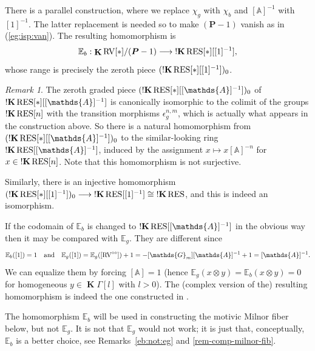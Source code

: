 \documentclass[12pt]{amsart}
\theoremstyle{plain}
\theoremstyle{definition}
\theoremstyle{remark}
\newtheorem{rem}[thm]{Remark}
\numberwithin{equation}{section}
\theoremstyle{plain}
\newcommand{\RV}{\textup{RV}}
\newcommand{\A}{\mathds{A}}
\newcommand{\G}{\mathds{G}}
\newcommand{\dand}{\quad \text{and} \quad}
\newcommand{\0}{\emptyset}
\newcommand{\bb}[1]{\mathbb{#1}}
\newcommand{\fun}{\longrightarrow}
\newcommand{\efun}{\longmapsto}
\newcommand{\RES}{\textup{RES}}
\DeclareMathOperator{\ggk}{\mathbf{K}}
\DeclareMathOperator{\sggk}{!\mathbf{K}}
\begin{document}
There is a parallel construction, where  we replace $\chi_g$ with $\chi_b$ and $[\A]^{-1}$ with $[1]^{-1}$. The latter replacement is needed so to make $(\bm P - 1)$ vanish as in (\ref{eg:isp:van}). The resulting homomorphism is
\begin{equation}\label{EB}
\bb E_b : \ggk \RV[*] / (\bm P - 1) \fun \sggk \RES[*][[1]^{-1}],
\end{equation}
whose range is precisely the zeroth piece  $(\sggk \RES[*][[1]^{-1}])_0$.

\begin{rem}\label{eb:no:eg}
The zeroth graded piece $(\sggk \RES[*][[\A]^{-1}])_0$ of $\sggk \RES[*][[\A]^{-1}]$ is canonically isomorphic to the colimit  of the groups $\sggk \RES[n]$ with the transition morphisms $\epsilon^{n,m}_g $, which is actually what appears in the construction above. So there is a natural homomorphism from $(\sggk \RES[*][[\A]^{-1}])_0$ to the similar-looking ring $\sggk \RES[[\A]^{-1}]$, induced by the assignment $x \efun x[\A]^{-n}$ for $x \in \sggk \RES[n]$. Note that this homomorphism is not surjective.


Similarly, there is an injective homomorphism $(\sggk \RES[*][[1]^{-1}])_0 \fun \sggk \RES[[1]^{-1}] \cong \sggk \RES$, and this is indeed an isomorphism.

If the codomain of $\bb E_b$ is changed to $\sggk \RES[[\A]^{-1}]$ in the obvious way then it may be compared with $\bb E_g$. They are different since
\begin{equation}\label{eb:neq:eg:counter}
\bb E_b([1]) = 1 \dand \bb E_g([1]) = \bb E_g([\RV^{\circ\circ}]) + 1 = -[\G_m][\A]^{-1} + 1 = [\A]^{-1}.
\end{equation}
We can equalize them by forcing $[\A] = 1$ (hence $\bb E_{g}(x \otimes y) = \bb E_{b}(x \otimes y) = 0$ for homogeneous $y \in \ggk \Gamma[l]$ with $l>0$). The (complex version of the) resulting homomorphism is indeed the one constructed in \cite[(2.5.7)]{hru:loe:lef}.
\end{rem}

The homomorphism $\bb E_b$ will be used in constructing the motivic Milnor fiber below, but not $\bb E_g$. It is not that  $\bb E_g$ would not work; it is just that, conceptually, $\bb E_b$ is a better choice,  see Remarks~\ref{eb:not:eg} and \ref{rem-comp-milnor-fib}.


\end{document}
